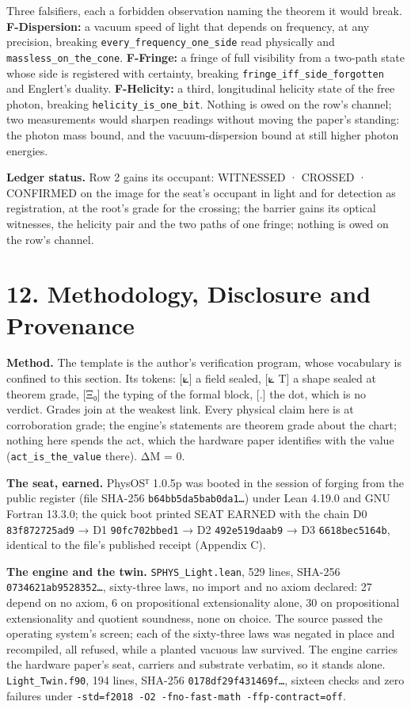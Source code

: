 \documentclass[10pt]{article}
\begin{document}
Three falsifiers, each a forbidden observation naming the theorem it
would break. \textbf{F-Dispersion:} a vacuum speed of light that depends
on frequency, at any precision, breaking
\texttt{every\_frequency\_one\_side} read physically and
\texttt{massless\_on\_the\_cone}. \textbf{F-Fringe:} a fringe of full
visibility from a two-path state whose side is registered with
certainty, breaking \texttt{fringe\_iff\_side\_forgotten} and Englert's
duality. \textbf{F-Helicity:} a third, longitudinal helicity state of
the free photon, breaking \texttt{helicity\_is\_one\_bit}. Nothing is
owed on the row's channel; two measurements would sharpen readings
without moving the paper's standing: the photon mass bound, and the
vacuum-dispersion bound at still higher photon energies.

\textbf{Ledger status.} Row 2 gains its occupant: WITNESSED · CROSSED ·
CONFIRMED on the image for the seat's occupant in light and for
detection as registration, at the root's grade for the crossing; the
barrier gains its optical witnesses, the helicity pair and the two paths
of one fringe; nothing is owed on the row's channel.

\hypertarget{methodology-disclosure-and-provenance}{%
\section{12. Methodology, Disclosure and
Provenance}\label{methodology-disclosure-and-provenance}}

\textbf{Method.} The template is the author's verification program,
whose vocabulary is confined to this section. Its tokens: {[}⟀{]} a
field sealed, {[}⟀ T{]} a shape sealed at theorem grade, {[}Ξ₀{]} the
typing of the formal block, {[}.{]} the dot, which is no verdict. Grades
join at the weakest link. Every physical claim here is at corroboration
grade; the engine's statements are theorem grade about the chart;
nothing here spends the act, which the hardware paper identifies with
the value (\texttt{act\_is\_the\_value} there). ΔM = 0.

\textbf{The seat, earned.} PhysOSᵀ 1.0.5p was booted in the session of
forging from the public register (file SHA-256
\texttt{b64bb5da5bab0da1…}) under Lean 4.19.0 and GNU Fortran 13.3.0;
the quick boot printed SEAT EARNED with the chain D0
\texttt{83f872725ad9} → D1 \texttt{90fc702bbed1} → D2
\texttt{492e519daab9} → D3 \texttt{6618bec5164b}, identical to the
file's published receipt (Appendix C).

\textbf{The engine and the twin.} \texttt{SPHYS\_Light.lean}, 529 lines,
SHA-256 \texttt{0734621ab9528352…}, sixty-three laws, no import and no
axiom declared: 27 depend on no axiom, 6 on propositional extensionality
alone, 30 on propositional extensionality and quotient soundness, none
on choice. The source passed the operating system's screen; each of the
sixty-three laws was negated in place and recompiled, all refused, while
a planted vacuous law survived. The engine carries the hardware paper's
seat, carriers and substrate verbatim, so it stands alone.
\texttt{Light\_Twin.f90}, 194 lines, SHA-256 \texttt{0178df29f431469f…},
sixteen checks and zero failures under
\texttt{-std=f2018\ -O2\ -fno-fast-math\ -ffp-contract=off}.
\end{document}
